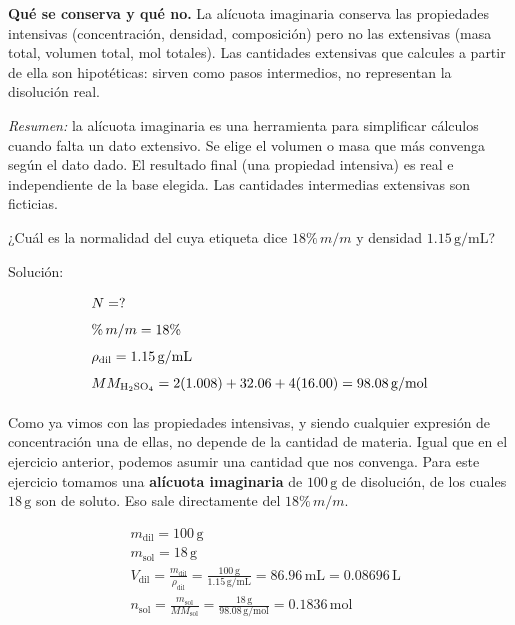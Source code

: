 \textbf{Qué se conserva y qué no.} La alícuota imaginaria conserva las 
propiedades intensivas (concentración, densidad, composición) pero no las 
extensivas (masa total, volumen total, mol totales). Las cantidades 
extensivas que calcules a partir de ella son hipotéticas: sirven como pasos 
intermedios, no representan la disolución real.

\textit{Resumen:} la alícuota imaginaria es una herramienta para simplificar 
cálculos cuando falta un dato extensivo. Se elige el volumen o masa que más 
convenga según el dato dado. El resultado final (una propiedad intensiva) es 
real e independiente de la base elegida. Las cantidades intermedias 
extensivas son ficticias.

\begin{exercise}{}{}
¿Cuál es la normalidad del  cuya etiqueta dice $18\%\,m/m$ y 
densidad $1.15\,\mathrm{g/mL}$?

Solución:

\begin{align*}
    &N = ? \\[4pt]
    &\%\,m/m = 18\% \\[4pt]
    &\rho_{\mathrm{dil}} = 1.15\,\mathrm{g/mL} \\[4pt]
    &MM_{\ce{H2SO4}} = 2(1.008) + 32.06 + 4(16.00) = 98.08\,\mathrm{g/mol} \\[4pt]
\end{align*}

Como ya vimos con las propiedades intensivas, y siendo cualquier expresión de 
concentración una de ellas, no depende de la cantidad de materia. Igual que en 
el ejercicio anterior, podemos asumir una cantidad que nos convenga. Para este 
ejercicio tomamos una \textbf{alícuota imaginaria} de $100\,\mathrm{g}$ de 
disolución, de los cuales $18\,\mathrm{g}$ son de soluto. Eso sale directamente 
del $18\%\,m/m$.

\begin{align*}
    &m_{\mathrm{dil}} = 100\,\mathrm{g} \\[4pt]
    &m_{\mathrm{sol}} = 18\,\mathrm{g} \\[4pt]
    &V_{\mathrm{dil}} = \frac{m_{\mathrm{dil}}}{\rho_{\mathrm{dil}}}
    = \frac{100\,\mathrm{g}}{1.15\,\mathrm{g/mL}}
    = 86.96\,\mathrm{mL} = 0.08696\,\mathrm{L}\\[4pt]
    &n_{\mathrm{sol}} = \frac{m_{\mathrm{sol}}}{MM_{\mathrm{sol}}}
    = \frac{18\,\mathrm{g} }{98.08\,\mathrm{g/mol}}
    = 0.1836\,\mathrm{mol}
\end{align*}


\end{exercise}
